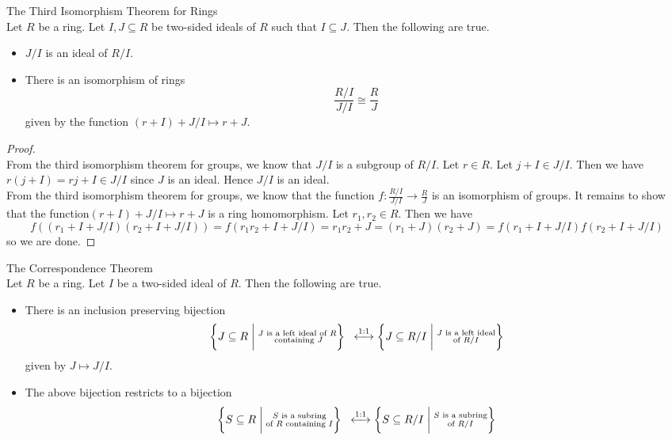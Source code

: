 \documentclass[a4paper]{article}
\begin{document}
\begin{thm}{The Third Isomorphism Theorem for Rings}{}\\
Let $R$ be a ring. Let $I,J\subseteq R$ be two-sided ideals of $R$ such that $I\subseteq J$. Then the following are true. 
\begin{itemize}
\item $J/I$ is an ideal of $R/I$. 
\item There is an isomorphism of rings $$\frac{R/I}{J/I}\cong\frac{R}{J}$$ given by the function $(r+I)+J/I\mapsto r+J$. 
\end{itemize}
\begin{proof}\\
From the third isomorphism theorem for groups, we know that $J/I$ is a subgroup of $R/I$. Let $r\in R$. Let $j+I\in J/I$. Then we have $r(j+I)=rj+I\in J/I$ since $J$ is an ideal. Hence $J/I$ is an ideal. \\

From the third isomorphism theorem for groups, we know that the function $f:\frac{R/I}{J/I}\to\frac{R}{J}$ is an isomorphism of groups. It remains to show that the function$(r+I)+J/I\mapsto r+J$ is a ring homomorphism. Let $r_1,r_2\in R$. Then we have $$f((r_1+I+J/I)(r_2+I+J/I))=f(r_1r_2+I+J/I)=r_1r_2+J=(r_1+J)(r_2+J)=f(r_1+I+J/I)f(r_2+I+J/I)$$ so we are done. 
\end{proof}
\end{thm}

\begin{thm}{The Correspondence Theorem}{}\\
Let $R$ be a ring. Let $I$ be a two-sided ideal of $R$. Then the following are true. 
\begin{itemize}
\item There is an inclusion preserving bijection $$\left\{J\subseteq R\;\bigg{|}\;\substack{J\text{ is a left ideal of }R\\\text{ containing }J}\right\}\;\;\overset{1:1}{\longleftrightarrow}\left\{J\subseteq R/I\;\bigg{|}\;\substack{J\text{ is a left ideal}\\\text{of }R/I}\right\}$$ given by $J\mapsto J/I$. 
\item The above bijection restricts to a bijection $$\left\{S\subseteq R\;\bigg{|}\;\substack{S\text{ is a subring}\\\text{of }R\text{ containing }I}\right\}\;\;\overset{1:1}{\longleftrightarrow}\left\{S\subseteq R/I\;\bigg{|}\;\substack{S\text{ is a subring}\\\text{of }R/I}\right\}$$
\end{itemize}
\end{thm}
\end{document}
